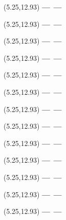 \documentclass[12pt,a4paper]{article}
\begin{document}
\begin{textblock}{3}(5.25,12.93)
{\bf ---}\quad\quad\ {\bf ---}
\end{textblock}
\newpage

\begin{textblock}{3}(5.25,12.93)
{\bf ---}\quad\quad\ {\bf ---}
\end{textblock}
\newpage

\begin{textblock}{3}(5.25,12.93)
{\bf ---}\quad\quad\ {\bf ---}
\end{textblock}
\newpage

\begin{textblock}{3}(5.25,12.93)
{\bf ---}\quad\quad\ {\bf ---}
\end{textblock}
\newpage

\begin{textblock}{3}(5.25,12.93)
{\bf ---}\quad\quad\ {\bf ---}
\end{textblock}
\newpage

\begin{textblock}{3}(5.25,12.93)
{\bf ---}\quad\quad\ {\bf ---}
\end{textblock}
\newpage

\begin{textblock}{3}(5.25,12.93)
{\bf ---}\quad\quad\ {\bf ---}
\end{textblock}
\newpage

\begin{textblock}{3}(5.25,12.93)
{\bf ---}\quad\quad\ {\bf ---}
\end{textblock}
\newpage

\begin{textblock}{3}(5.25,12.93)
{\bf ---}\quad\quad\ {\bf ---}
\end{textblock}
\newpage

\begin{textblock}{3}(5.25,12.93)
{\bf ---}\quad\quad\ {\bf ---}
\end{textblock}
\newpage

\begin{textblock}{3}(5.25,12.93)
{\bf ---}\quad\quad\ {\bf ---}
\end{textblock}
\newpage

\begin{textblock}{3}(5.25,12.93)
{\bf ---}\quad\quad\ {\bf ---}
\end{textblock}
\newpage

\begin{textblock}{3}(5.25,12.93)
{\bf ---}\quad\quad\ {\bf ---}
\end{textblock}
\newpage
\end{document}
